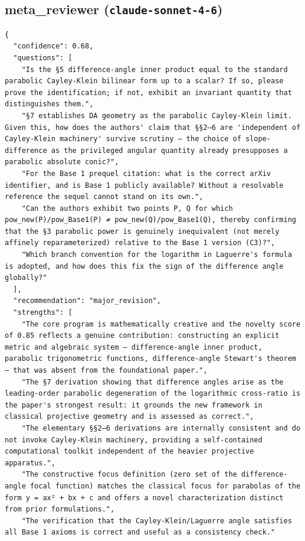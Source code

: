 \documentclass[11pt]{article}
\begin{document}
\subsection*{meta_reviewer (\texttt{claude-sonnet-4-6})}
\begin{verbatim}
{
  "confidence": 0.68,
  "questions": [
    "Is the §5 difference-angle inner product equal to the standard parabolic Cayley-Klein bilinear form up to a scalar? If so, please prove the identification; if not, exhibit an invariant quantity that distinguishes them.",
    "§7 establishes DA geometry as the parabolic Cayley-Klein limit. Given this, how does the authors' claim that §§2–6 are 'independent of Cayley-Klein machinery' survive scrutiny — the choice of slope-difference as the privileged angular quantity already presupposes a parabolic absolute conic?",
    "For the Base 1 prequel citation: what is the correct arXiv identifier, and is Base 1 publicly available? Without a resolvable reference the sequel cannot stand on its own.",
    "Can the authors exhibit two points P, Q for which pow_new(P)/pow_Base1(P) ≠ pow_new(Q)/pow_Base1(Q), thereby confirming that the §3 parabolic power is genuinely inequivalent (not merely affinely reparameterized) relative to the Base 1 version (C3)?",
    "Which branch convention for the logarithm in Laguerre's formula is adopted, and how does this fix the sign of the difference angle globally?"
  ],
  "recommendation": "major_revision",
  "strengths": [
    "The core program is mathematically creative and the novelty score of 0.85 reflects a genuine contribution: constructing an explicit metric and algebraic system — difference-angle inner product, parabolic trigonometric functions, difference-angle Stewart's theorem — that was absent from the foundational paper.",
    "The §7 derivation showing that difference angles arise as the leading-order parabolic degeneration of the logarithmic cross-ratio is the paper's strongest result: it grounds the new framework in classical projective geometry and is assessed as correct.",
    "The elementary §§2–6 derivations are internally consistent and do not invoke Cayley-Klein machinery, providing a self-contained computational toolkit independent of the heavier projective apparatus.",
    "The constructive focus definition (zero set of the difference-angle focal function) matches the classical focus for parabolas of the form y = ax² + bx + c and offers a novel characterization distinct from prior formulations.",
    "The verification that the Cayley-Klein/Laguerre angle satisfies all Base 1 axioms is correct and useful as a consistency check."

\end{verbatim}
\end{document}
